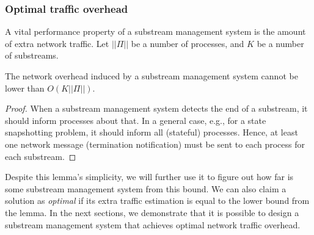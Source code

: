 \subsubsection{Optimal traffic overhead}

A vital performance property of a substream management system is the amount of extra network traffic. Let $||\Pi||$ be a number of processes, and $K$ be a number of substreams. 

\begin{lemma}
The network overhead induced by a substream management system cannot be lower than $O(K||\Pi||)$. 
\end{lemma}
\begin{proof}
When a substream management system detects the end of a substream, it should inform processes about that. In a general case, e.g., for a state snapshotting problem, it should inform all (stateful) processes. Hence, at least one network message (termination notification) must be sent to each process for each substream.
\end{proof}

Despite this lemma's simplicity, we will further use it to figure out how far is some substream management system from this bound. We can also claim a solution as {\em optimal} if its extra traffic estimation is equal to the lower bound from the lemma. In the next sections, we demonstrate that it is possible to design a substream management system that achieves optimal network traffic overhead.
